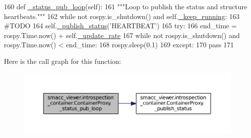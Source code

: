 \begin{DoxyCode}
160     \textcolor{keyword}{def }\hyperlink{classsmacc__viewer_1_1introspection__container_1_1ContainerProxy_add467b244a7907cd5717d352985e72b3}{\_status\_pub\_loop}(self):
161         \textcolor{stringliteral}{"""Loop to publish the status and structure heartbeats."""}
162         \textcolor{keywordflow}{while} \textcolor{keywordflow}{not} rospy.is\_shutdown() \textcolor{keywordflow}{and} self.\hyperlink{classsmacc__viewer_1_1introspection__container_1_1ContainerProxy_ae4526126fccd31f57df2e44b04de8517}{\_keep\_running}:
163             \textcolor{comment}{#TODO}
164             self.\hyperlink{classsmacc__viewer_1_1introspection__container_1_1ContainerProxy_ad4a053afedd3cc6cdc2e30b6db418e7e}{\_publish\_status}(\textcolor{stringliteral}{'HEARTBEAT'})
165             \textcolor{keywordflow}{try}:
166                 end\_time = rospy.Time.now() + self.\hyperlink{classsmacc__viewer_1_1introspection__container_1_1ContainerProxy_a0c5222106d95d0d78632d21873b7d2a8}{\_update\_rate}
167                 \textcolor{keywordflow}{while} \textcolor{keywordflow}{not} rospy.is\_shutdown() \textcolor{keywordflow}{and} rospy.Time.now() < end\_time:
168                     rospy.sleep(0.1)
169             \textcolor{keywordflow}{except}:
170                 \textcolor{keywordflow}{pass}
171 
\end{DoxyCode}


Here is the call graph for this function\+:
\nopagebreak
\begin{figure}[H]
\begin{center}
\leavevmode
\includegraphics[width=350pt]{classsmacc__viewer_1_1introspection__container_1_1ContainerProxy_add467b244a7907cd5717d352985e72b3_cgraph}
\end{center}
\end{figure}


